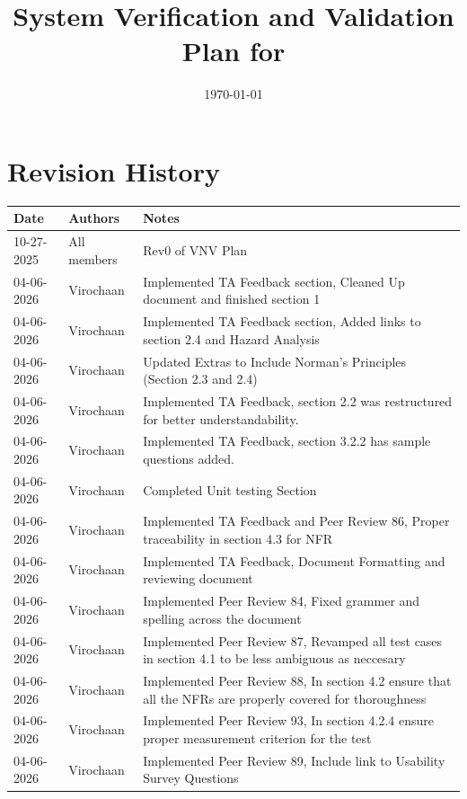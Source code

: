 \documentclass[12pt, titlepage]{article}
\begin{document}
\title{System Verification and Validation Plan for \progname{}}
\author{\authname}
\date{\today}

\maketitle


\section*{Revision History}

\begin{tabularx}{\textwidth}{p{3cm}p{2cm}X}
\toprule {\bf Date} & {\bf Authors} & {\bf Notes}\\
\midrule
10-27-2025 & All members & Rev0 of VNV Plan\\
04-06-2026 & Virochaan & Implemented TA Feedback section, Cleaned Up document and finished section 1\\
04-06-2026 & Virochaan & Implemented TA Feedback section, Added links to section 2.4 and Hazard Analysis\\
04-06-2026 & Virochaan & Updated Extras to Include Norman's Principles (Section 2.3 and 2.4)\\
04-06-2026 & Virochaan & Implemented TA Feedback, section 2.2 was restructured for better understandability. \\
04-06-2026 & Virochaan & Implemented TA Feedback, section 3.2.2 has sample questions added. \\
04-06-2026 & Virochaan & Completed Unit testing Section \\
04-06-2026 & Virochaan & Implemented TA Feedback and Peer Review 86, Proper traceability in section 4.3 for NFR \\
04-06-2026 & Virochaan & Implemented TA Feedback, Document Formatting and reviewing document \\
04-06-2026 & Virochaan & Implemented Peer Review 84, Fixed grammer and spelling across the document\\
04-06-2026 & Virochaan & Implemented Peer Review 87, Revamped all test cases in section 4.1 to be less ambiguous as neccesary\\
04-06-2026 & Virochaan & Implemented Peer Review 88, In section 4.2 ensure that all the NFRs are properly covered for thoroughness\\
04-06-2026 & Virochaan & Implemented Peer Review 93, In section 4.2.4 ensure proper measurement criterion for the test\\
04-06-2026 & Virochaan & Implemented Peer Review 89, Include link to Usability Survey Questions\\
\bottomrule
\end{tabularx}
\end{document}
